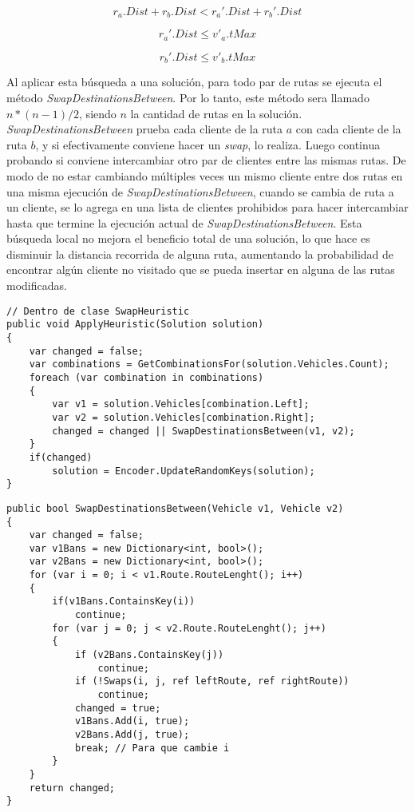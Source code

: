 \begin{equation*}
r_a.Dist + r_b.Dist < r_a'.Dist + r_b'.Dist \nonumber
\end{equation*}

\begin{equation*}
r_a'.Dist \leq v'_a.tMax
\end{equation*}

\begin{equation*}
r_b'.Dist \leq v'_b.tMax
\end{equation*}

Al aplicar esta búsqueda a una solución, para todo par de rutas se ejecuta el método \textit{SwapDestinationsBetween}. Por lo tanto, este método sera llamado $n * (n-1) / 2$, siendo $n$ la cantidad de rutas en la solución. \textit{SwapDestinationsBetween} prueba cada cliente de la ruta $a$ con cada cliente de la ruta $b$, y si efectivamente conviene hacer un \textit{swap}, lo realiza. Luego continua probando si conviene intercambiar otro par de clientes entre las mismas rutas. De modo de no estar cambiando múltiples veces un mismo cliente entre dos rutas en una misma ejecución de \textit{SwapDestinationsBetween}, cuando se cambia de ruta a un cliente, se lo agrega en una lista de clientes prohibidos para hacer intercambiar hasta que termine la ejecución actual de \textit{SwapDestinationsBetween}. Esta búsqueda local no mejora el beneficio total de una solución, lo que hace es disminuir la distancia recorrida de alguna ruta, aumentando la probabilidad de encontrar algún cliente no visitado que se pueda insertar en alguna de las rutas modificadas.

\bigskip

\begin{minipage}{\textwidth}
\begin{lstlisting}
// Dentro de clase SwapHeuristic
public void ApplyHeuristic(Solution solution)
{
	var changed = false;
	var combinations = GetCombinationsFor(solution.Vehicles.Count);
	foreach (var combination in combinations)
	{
		var v1 = solution.Vehicles[combination.Left];
		var v2 = solution.Vehicles[combination.Right];
		changed = changed || SwapDestinationsBetween(v1, v2);
	}
	if(changed)
		solution = Encoder.UpdateRandomKeys(solution);
}
\end{lstlisting}
\end{minipage}

\begin{minipage}{\textwidth}
\begin{lstlisting}
public bool SwapDestinationsBetween(Vehicle v1, Vehicle v2)
{
	var changed = false;
	var v1Bans = new Dictionary<int, bool>();
	var v2Bans = new Dictionary<int, bool>();
	for (var i = 0; i < v1.Route.RouteLenght(); i++)
	{
		if(v1Bans.ContainsKey(i)) 
			continue;
		for (var j = 0; j < v2.Route.RouteLenght(); j++)
		{
			if (v2Bans.ContainsKey(j)) 
				continue;
			if (!Swaps(i, j, ref leftRoute, ref rightRoute)) 
				continue;
			changed = true;
			v1Bans.Add(i, true);
			v2Bans.Add(j, true);
			break; // Para que cambie i
		}
	}
	return changed;
}
\end{lstlisting}
\end{minipage}


